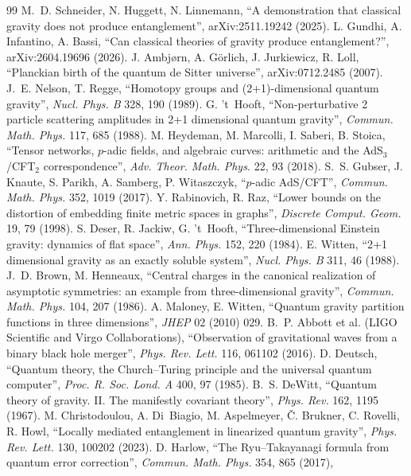 \documentclass[11pt,a4paper]{article}
\theoremstyle{definition}
\theoremstyle{remark}
\begin{document}
\begin{thebibliography}{99}
 M.~D. Schneider, N. Huggett, N. Linnemann, ``A demonstration that classical gravity does not produce entanglement'',
arXiv:2511.19242 (2025).
 L. Gundhi, A. Infantino, A. Bassi, ``Can classical theories of gravity produce entanglement?'', arXiv:2604.19696 (2026).
 J. Ambj{\o}rn, A. G{\"o}rlich, J. Jurkiewicz, R. Loll, ``Planckian birth of the quantum de Sitter universe'',
arXiv:0712.2485 (2007).
 J.~E. Nelson, T. Regge, ``Homotopy groups and (2+1)-dimensional quantum gravity'', \emph{Nucl. Phys. B} 328, 190 (1989).
 G. 't~Hooft, ``Non-perturbative 2 particle scattering amplitudes in 2+1 dimensional quantum gravity'',
\emph{Commun. Math. Phys.} 117, 685 (1988).
 M. Heydeman, M. Marcolli, I. Saberi, B. Stoica, ``Tensor networks, $p$-adic fields, and algebraic curves: arithmetic and
the AdS$_3$/CFT$_2$ correspondence'', \emph{Adv. Theor. Math. Phys.} 22, 93 (2018).
 S.~S. Gubser, J. Knaute, S. Parikh, A. Samberg, P. Witaszczyk, ``$p$-adic AdS/CFT'', \emph{Commun. Math. Phys.} 352,
1019 (2017).
 Y. Rabinovich, R. Raz, ``Lower bounds on the distortion of embedding finite metric spaces in graphs'', \emph{Discrete
Comput. Geom.} 19, 79 (1998).
 S. Deser, R. Jackiw, G. 't~Hooft, ``Three-dimensional Einstein gravity: dynamics of flat space'', \emph{Ann. Phys.} 152, 220
(1984).
 E. Witten, ``2+1 dimensional gravity as an exactly soluble system'', \emph{Nucl. Phys. B} 311, 46 (1988).
 J.~D. Brown, M. Henneaux, ``Central charges in the canonical realization of asymptotic symmetries: an example from
three-dimensional gravity'', \emph{Commun. Math. Phys.} 104, 207 (1986).
 A. Maloney, E. Witten, ``Quantum gravity partition functions in three dimensions'', \emph{JHEP} 02 (2010) 029.
 B.~P. Abbott et al. (LIGO Scientific and Virgo Collaborations), ``Observation of gravitational waves from a binary black
hole merger'', \emph{Phys. Rev. Lett.} 116, 061102 (2016).
 D. Deutsch, ``Quantum theory, the Church--Turing principle and the universal quantum computer'', \emph{Proc. R. Soc.
Lond. A} 400, 97 (1985).
 B.~S. DeWitt, ``Quantum theory of gravity. II. The manifestly covariant theory'', \emph{Phys. Rev.} 162, 1195 (1967).
 M. Christodoulou, A. Di~Biagio, M. Aspelmeyer, \v{C}. Brukner, C. Rovelli, R. Howl, ``Locally mediated
entanglement in linearized quantum gravity'', \emph{Phys. Rev. Lett.} 130, 100202 (2023).
 D. Harlow, ``The Ryu--Takayanagi formula from quantum error correction'', \emph{Commun. Math. Phys.} 354, 865 (2017),

\end{thebibliography}
\end{document}
